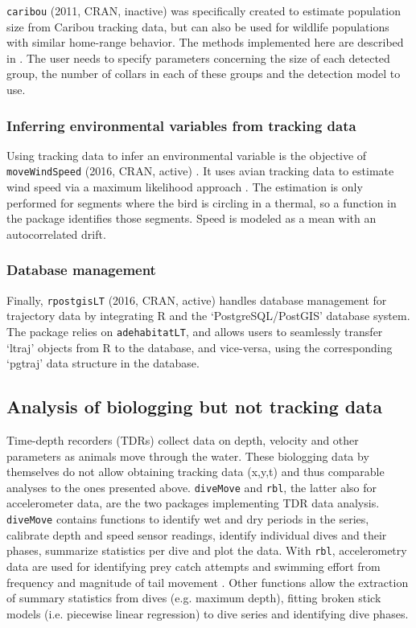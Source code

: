 \documentclass[a4paper,12pt]{article}
\newcommand{\Rpkg}[1]{\texttt{#1}}
\begin{document}
	\Rpkg{caribou} (2011, CRAN, inactive) \citep{Rcaribou} was specifically created to estimate population size from Caribou tracking data, but can also be used for wildlife populations with similar home-range behavior. The methods implemented here are described in \cite{Rivest1998}. The user needs to specify parameters concerning the size of each detected group, the number of collars in each of these groups and the detection model to use. 
	
	\subsubsection*{Inferring environmental variables from tracking data}
	
	Using tracking data to infer an environmental variable is the objective of \Rpkg{moveWindSpeed} (2016, CRAN, active) \citep{RmoveWindSpeed}. It uses avian tracking data to estimate wind speed via a maximum likelihood approach \citep{Weinzierl2016}. The estimation is only performed for segments where the bird is circling in a thermal, so a function in the package identifies those segments. Speed is modeled as a mean with an autocorrelated drift. 
	
	\subsubsection*{Database management}
	
	Finally, \Rpkg{rpostgisLT} (2016, CRAN, active) \citep{RrpostgisLT} handles database management for trajectory data by integrating R and the `PostgreSQL/PostGIS' database system. The package relies on \Rpkg{adehabitatLT}, and allows users to seamlessly transfer `ltraj' objects from R to the database, and vice-versa, using the corresponding `pgtraj' data structure in the database.
	
	\subsection*{Analysis of biologging but not tracking data}
	
	Time-depth recorders (TDRs) collect data on depth, velocity and other parameters as animals move through the water. These biologging data by themselves do not allow obtaining tracking data (x,y,t) and thus comparable analyses to the ones presented above. \Rpkg{diveMove} \citep{Luque2007} and \Rpkg{rbl}, the latter also for accelerometer data, are the two packages implementing TDR data analysis. \Rpkg{diveMove} contains functions to identify wet and dry periods in the series, calibrate depth and speed sensor readings, identify individual dives and their phases, summarize statistics per dive and plot the data. With \Rpkg{rbl}, accelerometry data are used for identifying prey catch attempts \citep{Viviant2010} and swimming effort from frequency and magnitude of tail movement \citep{Bras2016}. Other functions allow the extraction of summary statistics from dives (e.g. maximum depth), fitting broken stick models (i.e. piecewise linear regression) to dive series and identifying dive phases. 
	
\end{document}
